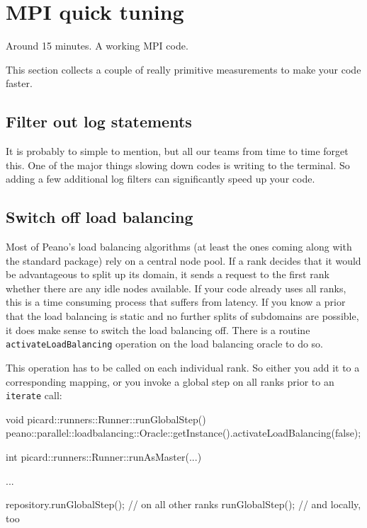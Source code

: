 \section{MPI quick tuning}


\chapterDescription
  {
    Around 15 minutes.
  }
  {
    A working MPI code.
  }


This section collects a couple of really primitive measurements to make your
code faster.

\subsection{Filter out log statements}

It is probably to simple to mention, but all our teams from time to time forget
this. 
One of the major things slowing down codes is writing to the terminal. 
So adding a few additional log filters can significantly speed up your code.



\subsection{Switch off load balancing}

Most of Peano's load balancing algorithms (at least the ones coming along with
the standard package) rely on a central node pool.
If a rank decides that it would be advantageous to split up its domain, it sends
a request to the first rank whether there are any idle nodes available.
If your code already uses all ranks, this is a time consuming process that
suffers from latency.
If you know a prior that the load balancing is static and no further splits of
subdomains are possible, it does make sense to switch the load balancing off.
There is a routine \texttt{activateLoadBalancing} operation on the load
balancing oracle to do so.

This operation has to be called on each individual rank.
So either you add it to a corresponding mapping, or you invoke a global step on
all ranks prior to an \texttt{iterate} call:

\begin{code}
void picard::runners::Runner::runGlobalStep() {
  peano::parallel::loadbalancing::Oracle::getInstance().activateLoadBalancing(false);
}


int picard::runners::Runner::runAsMaster(...) {
  ...
  
  repository.runGlobalStep(); // on all other ranks
  runGlobalStep();            // and locally, too
}
\end{code}



